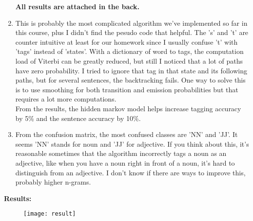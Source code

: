 \documentclass[12pt]{article}
\begin{document}
\begin{enumerate}
	\textbf{All results are attached in the back.}
	\item
	This is probably the most complicated algorithm we've implemented so far in this course, plus I didn't find the pesudo code that helpful. The 's' and 't' are counter intuitive at least for our homework since I usually confuse 't' with 'tags' instead of 'states'. With a dictionary of word to tags, the computation load of Viterbi can be greatly reduced, but still I noticed that a lot of paths have zero probability. I tried to ignore that tag in that state and its following paths, but for several sentences, the backtracking fails. One way to solve this is to use smoothing for both transition and emission probabilities but that requires a lot more computations. \\
	From the results, the hidden markov model helps increase tagging accuracy by 5\% and the sentence accuracy by 10\%.
	\item
	From the confusion matrix, the most confused classes are 'NN' and 'JJ'. It seems 'NN' stands for noun and 'JJ' for adjective. If you think about this, it's reasonable sometimes that the algorithm incorrectly tags a noun as an adjective, like when you have a noun right in front of a noun, it's hard to distinguish from an adjective. I don't know if there are ways to improve this, probably higher n-grams.
\end{enumerate}


\textbf{Results:}
\begin{figure}[h]
	\texttt{[image: result]}
	\centering
\end{figure}
\end{document}
